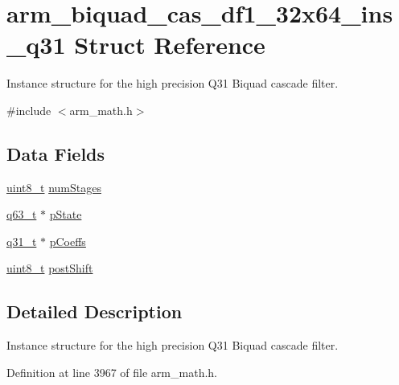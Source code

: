\hypertarget{structarm__biquad__cas__df1__32x64__ins__q31}{\section{arm\-\_\-biquad\-\_\-cas\-\_\-df1\-\_\-32x64\-\_\-ins\-\_\-q31 Struct Reference}
\label{structarm__biquad__cas__df1__32x64__ins__q31}
}


Instance structure for the high precision Q31 Biquad cascade filter.  




{\ttfamily \#include $<$arm\-\_\-math.\-h$>$}

\subsection*{Data Fields}
\begin{DoxyCompactItemize}
\item 
\hyperlink{stdint_8h_aba7bc1797add20fe3efdf37ced1182c5}{uint8\-\_\-t} \hyperlink{structarm__biquad__cas__df1__32x64__ins__q31_ad7cb9a9f5df8f4fcfc7a0b633672e574}{num\-Stages}
\item 
\hyperlink{arm__math_8h_a5aea1cb12fc02d9d44c8abf217eaa5c6}{q63\-\_\-t} $\ast$ \hyperlink{structarm__biquad__cas__df1__32x64__ins__q31_a4c899cdfaf2bb955323e93637bd662e0}{p\-State}
\item 
\hyperlink{arm__math_8h_adc89a3547f5324b7b3b95adec3806bc0}{q31\-\_\-t} $\ast$ \hyperlink{structarm__biquad__cas__df1__32x64__ins__q31_a490462d6ebe0fecfb6acbf51bed22ecf}{p\-Coeffs}
\item 
\hyperlink{stdint_8h_aba7bc1797add20fe3efdf37ced1182c5}{uint8\-\_\-t} \hyperlink{structarm__biquad__cas__df1__32x64__ins__q31_a8e9d58e8dba5aa3b2fc4f36d2ed07996}{post\-Shift}
\end{DoxyCompactItemize}


\subsection{Detailed Description}
Instance structure for the high precision Q31 Biquad cascade filter. 

Definition at line 3967 of file arm\-\_\-math.\-h.



